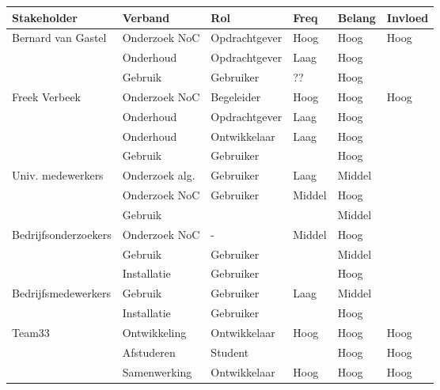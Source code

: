 {\tiny
\begin{center}
\begin{tabular}{llllll}\hline
{\bf Stakeholder}    & {\bf Verband}   & {\bf Rol}     & {\bf Freq} & {\bf Belang} & {\bf Invloed}\\\hline
Bernard van Gastel   & Onderzoek NoC  & Opdrachtgever & Hoog       & Hoog   & Hoog \\
                     & Onderhoud      & Opdrachtgever & Laag       & Hoog   &  \\
                     & Gebruik        & Gebruiker     & ??         & Hoog   & \\
Freek Verbeek        & Onderzoek NoC  & Begeleider    & Hoog       & Hoog   & Hoog\\
                     & Onderhoud      & Opdrachtgever & Laag       & Hoog   & \\
                     & Onderhoud      & Ontwikkelaar  & Laag       & Hoog   & \\
                     & Gebruik        & Gebruiker     &            & Hoog   & \\
Univ. medewerkers    & Onderzoek alg. & Gebruiker     & Laag       & Middel & \\
                     & Onderzoek NoC  & Gebruiker     & Middel     & Hoog   & \\
                     & Gebruik        &               &            & Middel & \\
Bedrijfsonderzoekers & Onderzoek NoC  & -             & Middel     & Hoog   & \\
                     & Gebruik        & Gebruiker     &            & Middel & \\
                     & Installatie    & Gebruiker     &            & Hoog   & \\
Bedrijfsmedewerkers  & Gebruik        & Gebruiker     & Laag       & Middel & \\
                     & Installatie    & Gebruiker     &            & Hoog   & \\
Team33               & Ontwikkeling   & Ontwikkelaar  & Hoog       & Hoog   & Hoog\\
                     & Afstuderen     & Student       &            & Hoog   & Hoog\\
                     & Samenwerking   & Ontwikkelaar  & Hoog       & Hoog   & Hoog\\
\hline
\end{tabular}
\end{center}
}%


